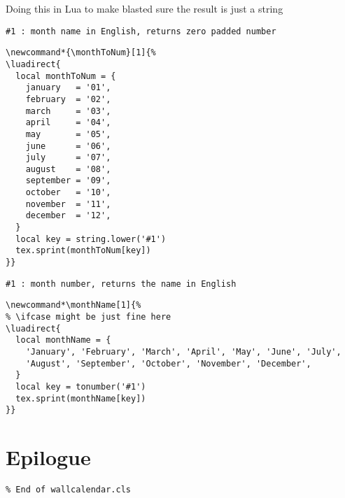 \documentclass[11pt,oneside]{memoir-article}
\begin{document}
Doing this in Lua to make blasted sure the result is just a string

\begin{verbatim}
#1 : month name in English, returns zero padded number
\end{verbatim}

\begin{verbatim}
\newcommand*{\monthToNum}[1]{%
\luadirect{
  local monthToNum = {
    january   = '01',
    february  = '02',
    march     = '03',
    april     = '04',
    may       = '05',
    june      = '06',
    july      = '07',
    august    = '08',
    september = '09',
    october   = '10',
    november  = '11',
    december  = '12',
  }
  local key = string.lower('#1')
  tex.sprint(monthToNum[key])
}}
\end{verbatim}

\begin{verbatim}
#1 : month number, returns the name in English
\end{verbatim}

\begin{verbatim}
\newcommand*\monthName[1]{%
% \ifcase might be just fine here
\luadirect{
  local monthName = {
    'January', 'February', 'March', 'April', 'May', 'June', 'July',
    'August', 'September', 'October', 'November', 'December',
  }
  local key = tonumber('#1')
  tex.sprint(monthName[key])
}}
\end{verbatim}

\chapter{Epilogue}
\label{sec:org8f36044}

\begin{verbatim}
% End of wallcalendar.cls
\end{verbatim}
\end{document}
